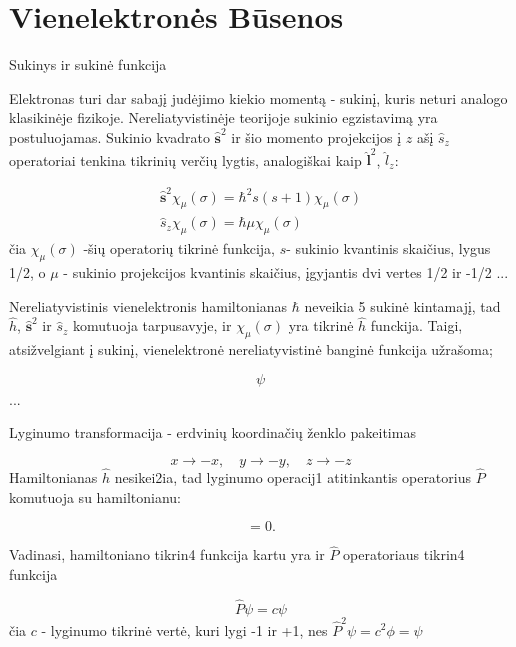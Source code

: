 \section{Vienelektronės Būsenos}

Sukinys ir sukinė funkcija

Elektronas turi dar sabajį judėjimo kiekio momentą - sukinį, kuris neturi analogo klasikinėje fizikoje. Nereliatyvistinėje teorijoje sukinio egzistavimą yra postuluojamas. Sukinio kvadrato $\hat{\bm{s}}^2$ ir šio momento projekcijos į $z$ ašį $\hat{s}_z$ operatoriai tenkina tikrinių verčių lygtis, analogiškai kaip $\hat{\bm{l}}^2$, $\hat{l}_z$:

\begin{align*}
    \hat{\bm{s}}^2 \chi_{\mu} (\sigma) = \hbar^2 s(s+1) \chi_{\mu} (\sigma)\\
    \hat{s}_z \chi_{\mu} (\sigma) = \hbar \mu \chi_{\mu} (\sigma)
\end{align*}
čia $\chi_{\mu}(\sigma)$ -šių operatorių tikrinė funkcija, $s$- sukinio kvantinis skaičius, lygus 1/2, o $\mu$ - sukinio projekcijos kvantinis skaičius, įgyjantis dvi vertes 1/2 ir -1/2
...

Nereliatyvistinis vienelektronis hamiltonianas $\hbar$ neveikia 5 sukinė kintamajį, tad $\hat{h}$, $\hat{\bm{s}}^2$ ir $\hat{s}_z$ komutuoja tarpusavyje, ir $\chi_{\mu}(\sigma)$ yra tikrinė $\hat{h}$ funckija. Taigi, atsižvelgiant į sukinį, vienelektronė nereliatyvistinė banginė funkcija užrašoma;

\begin{equation*}
    \psi_{}
\end{equation*}
...

Lyginumo transformacija - erdvinių koordinačių ženklo pakeitimas

\begin{equation*}
    x \rightarrow -x, \quad y \rightarrow -y, \quad z \rightarrow -z
\end{equation*}
Hamiltonianas $\hat{h}$ nesikei2ia, tad lyginumo operacij1 atitinkantis operatorius $\hat{P}$ komutuoja su hamiltonianu:

\begin{equation*}
    [\hat{P}, \hat{h}] = 0.
\end{equation*}

Vadinasi, hamiltoniano tikrin4 funkcija kartu yra ir $\hat{P}$ operatoriaus tikrin4 funkcija

\begin{equation*}
    \hat{P} \psi = c \psi
\end{equation*}
čia $c$ - lyginumo tikrinė vertė, kuri lygi -1 ir +1, nes $\hat{P}^2 \psi = c^2 \phi = \psi$


